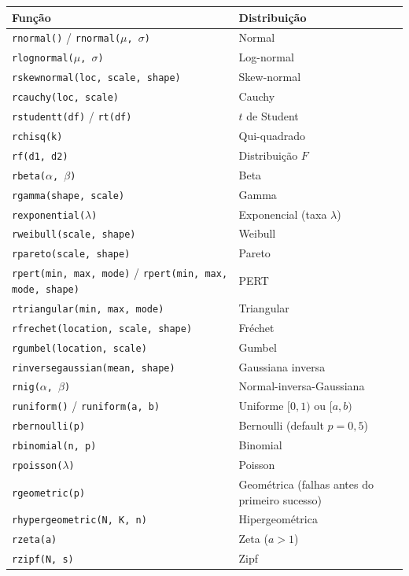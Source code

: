 \begin{center}
\begin{tabular}{ll}
\toprule
\textbf{Função} & \textbf{Distribuição} \\
\midrule
\texttt{rnormal()} / \texttt{rnormal($\mu$, $\sigma$)} & Normal \\
\texttt{rlognormal($\mu$, $\sigma$)} & Log-normal \\
\texttt{rskewnormal(loc, scale, shape)} & Skew-normal \\
\texttt{rcauchy(loc, scale)} & Cauchy \\
\texttt{rstudentt(df)} / \texttt{rt(df)} & $t$ de Student \\
\texttt{rchisq(k)} & Qui-quadrado \\
\texttt{rf(d1, d2)} & Distribuição $F$ \\
\texttt{rbeta($\alpha$, $\beta$)} & Beta \\
\texttt{rgamma(shape, scale)} & Gamma \\
\texttt{rexponential($\lambda$)} & Exponencial (taxa $\lambda$) \\
\texttt{rweibull(scale, shape)} & Weibull \\
\texttt{rpareto(scale, shape)} & Pareto \\
\texttt{rpert(min, max, mode)} / \texttt{rpert(min, max, mode, shape)} & PERT \\
\texttt{rtriangular(min, max, mode)} & Triangular \\
\texttt{rfrechet(location, scale, shape)} & Fr\'{e}chet \\
\texttt{rgumbel(location, scale)} & Gumbel \\
\texttt{rinversegaussian(mean, shape)} & Gaussiana inversa \\
\texttt{rnig($\alpha$, $\beta$)} & Normal-inversa-Gaussiana \\
\texttt{runiform()} / \texttt{runiform(a, b)} & Uniforme $[0,1)$ ou $[a,b)$ \\
\midrule
\texttt{rbernoulli(p)} & Bernoulli (default $p=0{,}5$) \\
\texttt{rbinomial(n, p)} & Binomial \\
\texttt{rpoisson($\lambda$)} & Poisson \\
\texttt{rgeometric(p)} & Geométrica (falhas antes do primeiro sucesso) \\
\texttt{rhypergeometric(N, K, n)} & Hipergeométrica \\
\texttt{rzeta(a)} & Zeta ($a>1$) \\
\texttt{rzipf(N, s)} & Zipf \\
\bottomrule
\end{tabular}
\end{center}

